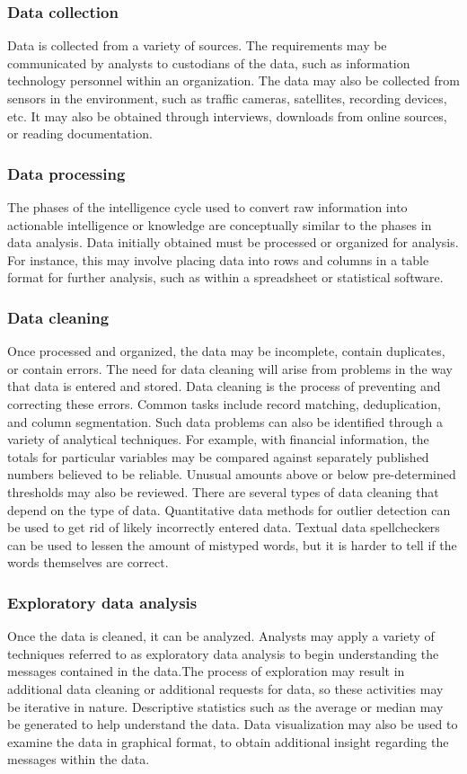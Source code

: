 \documentclass[a4paper,12pt,oneside]{report}
\begin{document}
{{\subsubsection{Data collection}
{Data is collected from a variety of sources. The requirements may be communicated by analysts to custodians of the data, such as information technology personnel within an organization. The data may also be collected from sensors in the environment, such as traffic cameras, satellites, recording devices, etc. It may also be obtained through interviews, downloads from online sources, or reading documentation.}
\subsubsection{Data processing}
{The phases of the intelligence cycle used to convert raw information into actionable intelligence or knowledge are conceptually similar to the phases in data analysis.
Data initially obtained must be processed or organized for analysis. For instance, this may involve placing data into rows and columns in a table format for further analysis, such as within a spreadsheet or statistical software.}
\subsubsection{Data cleaning}
{Once processed and organized, the data may be incomplete, contain duplicates, or contain errors. The need for data cleaning will arise from problems in the way that data is entered and stored. Data cleaning is the process of preventing and correcting these errors. Common tasks include record matching, deduplication, and column segmentation. Such data problems can also be identified through a variety of analytical techniques. For example, with financial information, the totals for particular variables may be compared against separately published numbers believed to be reliable. Unusual amounts above or below pre-determined thresholds may also be reviewed. There are several types of data cleaning that depend on the type of data. Quantitative data methods for outlier detection can be used to get rid of likely incorrectly entered data. Textual data spellcheckers can be used to lessen the amount of mistyped words, but it is harder to tell if the words themselves are correct.}
\subsubsection{Exploratory data analysis}
{Once the data is cleaned, it can be analyzed. Analysts may apply a variety of techniques referred to as exploratory data analysis to begin understanding the messages contained in the data.The process of exploration may result in additional data cleaning or additional requests for data, so these activities may be iterative in nature. Descriptive statistics such as the average or median may be generated to help understand the data. Data visualization may also be used to examine the data in graphical format, to obtain additional insight regarding the messages within the data.}
}}
\end{document}
